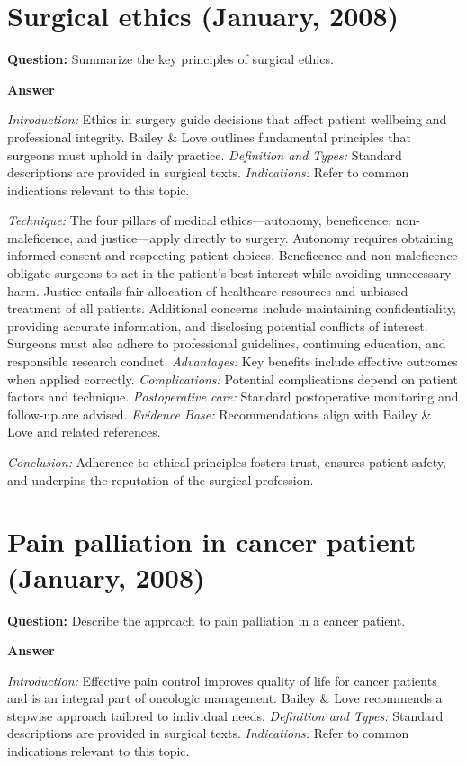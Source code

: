 \documentclass{article}
\begin{document}
\section{Surgical ethics (January, 2008)}

\textbf{Question:} Summarize the key principles of surgical ethics.

\textbf{Answer}

\emph{Introduction:} Ethics in surgery guide decisions that affect patient wellbeing and professional integrity. Bailey & Love outlines fundamental principles that surgeons must uphold in daily practice.
\emph{Definition and Types:} Standard descriptions are provided in surgical texts.
\emph{Indications:} Refer to common indications relevant to this topic.

\emph{Technique:} The four pillars of medical ethics—autonomy, beneficence, non-maleficence, and justice—apply directly to surgery. Autonomy requires obtaining informed consent and respecting patient choices. Beneficence and non-maleficence obligate surgeons to act in the patient's best interest while avoiding unnecessary harm. Justice entails fair allocation of healthcare resources and unbiased treatment of all patients. Additional concerns include maintaining confidentiality, providing accurate information, and disclosing potential conflicts of interest. Surgeons must also adhere to professional guidelines, continuing education, and responsible research conduct.
\emph{Advantages:} Key benefits include effective outcomes when applied correctly.
\emph{Complications:} Potential complications depend on patient factors and technique.
\emph{Postoperative care:} Standard postoperative monitoring and follow-up are advised.
\emph{Evidence Base:} Recommendations align with Bailey & Love and related references.

\emph{Conclusion:} Adherence to ethical principles fosters trust, ensures patient safety, and underpins the reputation of the surgical profession.


\section{Pain palliation in cancer patient (January, 2008)}

\textbf{Question:} Describe the approach to pain palliation in a cancer patient.

\textbf{Answer}

\emph{Introduction:} Effective pain control improves quality of life for cancer patients and is an integral part of oncologic management. Bailey & Love recommends a stepwise approach tailored to individual needs.
\emph{Definition and Types:} Standard descriptions are provided in surgical texts.
\emph{Indications:} Refer to common indications relevant to this topic.
\end{document}
